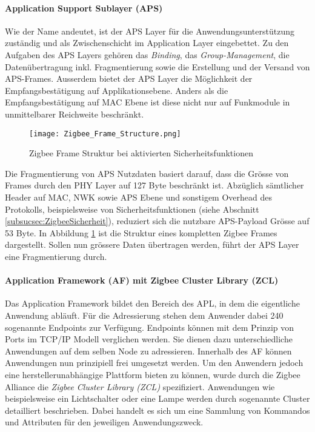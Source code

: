 \paragraph{Application Support Sublayer (APS)}
Wie der Name andeutet, ist der APS Layer für die Anwendungsunterstützung zuständig und als Zwischenschicht im Application Layer eingebettet.
Zu den Aufgaben des APS Layers gehören das \textit{Binding}, das \textit{Group-Management}, die Datenübertragung inkl. Fragmentierung sowie die Erstellung und der Versand von APS-Frames.
Ausserdem bietet der APS Layer die Möglichkeit der Empfangsbestätigung auf Applikationsebene.
Anders als die Empfangsbestätigung auf MAC Ebene ist diese nicht nur auf Funkmodule in unmittelbarer Reichweite beschränkt.

\begin{figure}[h]
	\centering
	\texttt{[image: Zigbee\_Frame\_Structure.png]}
	\caption{Zigbee Frame Struktur bei aktivierten Sicherheitsfunktionen \cite[S.~286]{markus_krause_rainer_konrad_zigbee_2014}}
	\label{fig:ZigbeeFrameStruktur}
\end{figure}

Die Fragmentierung von APS Nutzdaten basiert darauf, dass die Grösse von Frames durch den PHY Layer auf 127 Byte beschränkt ist.
Abzüglich sämtlicher Header auf MAC, NWK sowie APS Ebene und sonstigem Overhead des Protokolls, beispielsweise von Sicherheitsfunktionen (siehe Abschnitt \ref{subsucsec:ZigbeeSicherheit}), reduziert sich die nutzbare APS-Payload Grösse auf 53 Byte. In Abbildung \ref{fig:ZigbeeFrameStruktur} ist die Struktur eines kompletten Zigbee Frames dargestellt.
Sollen nun grössere Daten übertragen werden, führt der APS Layer eine Fragmentierung durch. \cite[S.~279 - 299]{markus_krause_rainer_konrad_zigbee_2014}


\paragraph{Application Framework (AF) mit Zigbee Cluster Library (ZCL)}
Das Application Framework bildet den Bereich des APL, in dem die eigentliche Anwendung abläuft. Für die Adressierung stehen dem Anwender dabei 240 sogenannte Endpoints zur Verfügung. Endpoints können mit dem Prinzip von Ports im TCP/IP Modell verglichen werden.
Sie dienen dazu unterschiedliche Anwendungen auf dem selben Node zu adressieren.
Innerhalb des AF können Anwendungen nun prinzipiell frei umgesetzt werden.
Um den Anwendern jedoch eine herstellerunabhängige Plattform bieten zu können, wurde durch die Zigbee Alliance die \textit{Zigbee Cluster Library (ZCL)} spezifiziert.
Anwendungen wie beispielsweise ein Lichtschalter oder eine Lampe werden durch sogenannte Cluster detailliert beschrieben.
Dabei handelt es sich um eine Sammlung von Kommandos und Attributen für den jeweiligen Anwendungszweck. \cite{the_zigbee_alliance_zigbee_2016}

